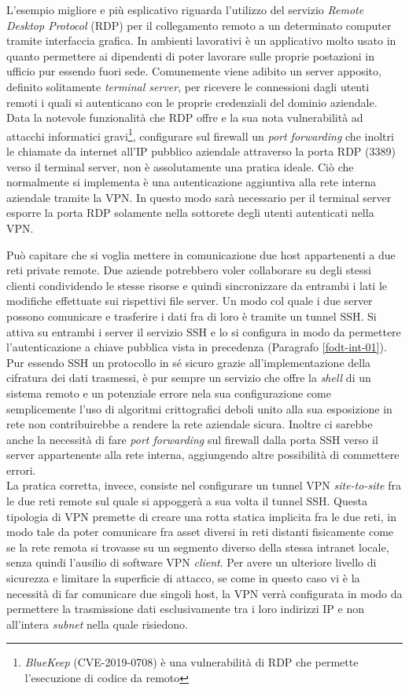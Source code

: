 \documentclass[target=bach,aauheader=]{thud}
\begin{document}
L'esempio migliore e più esplicativo riguarda l'utilizzo del servizio \textit{Remote Desktop Protocol} (RDP) per il collegamento remoto a un determinato computer tramite interfaccia grafica. In ambienti lavorativi è un applicativo molto usato in quanto permettere ai dipendenti di poter lavorare sulle proprie postazioni in ufficio pur essendo fuori sede. Comunemente viene adibito un server apposito, definito solitamente \textit{terminal server}, per ricevere le connessioni dagli utenti remoti i quali si autenticano con le proprie credenziali del dominio aziendale. Data la notevole funzionalità che RDP offre e la sua nota vulnerabilità ad attacchi informatici gravi\footnote{\textit{BlueKeep} (CVE-2019-0708) è una vulnerabilità di RDP che permette l'esecuzione di codice da remoto}, configurare sul firewall un \textit{port forwarding} che inoltri le chiamate da internet all'IP pubblico aziendale attraverso la porta RDP (3389) verso il terminal server, non è assolutamente una pratica ideale. Ciò che normalmente si implementa è una autenticazione aggiuntiva alla rete interna aziendale tramite la VPN. In questo modo sarà necessario per il terminal server esporre la porta RDP solamente nella sottorete degli utenti autenticati nella VPN.

Può capitare che si voglia mettere in comunicazione due host appartenenti a due reti private remote. Due aziende potrebbero voler collaborare su degli stessi clienti condividendo le stesse risorse e quindi sincronizzare da entrambi i lati le modifiche effettuate sui rispettivi file server. Un modo col quale i due server possono comunicare e trasferire i dati fra di loro è tramite un tunnel SSH. Si attiva su entrambi i server il servizio SSH e lo si configura in modo da permettere l'autenticazione a chiave pubblica vista in precedenza (Paragrafo \ref{fodt-int-01}). Pur essendo SSH un protocollo in sé sicuro grazie all'implementazione della cifratura dei dati trasmessi, è pur sempre un servizio che offre la \textit{shell} di un sistema remoto e un potenziale errore nela sua configurazione come semplicemente l'uso di algoritmi crittografici deboli unito alla sua esposizione in rete non contribuirebbe a rendere la rete aziendale sicura. Inoltre ci sarebbe anche la necessità di fare \textit{port forwarding} sul firewall dalla porta SSH verso il server appartenente alla rete interna, aggiungendo altre possibilità di commettere errori.
\\ La pratica corretta, invece, consiste nel configurare un tunnel VPN \textit{site-to-site} fra le due reti remote sul quale si appoggerà a sua volta il tunnel SSH. Questa tipologia di VPN premette di creare una rotta statica implicita fra le due reti, in modo tale da poter comunicare fra asset diversi in reti distanti fisicamente come se la rete remota si trovasse su un segmento diverso della stessa intranet locale, senza quindi l'ausilio di software VPN \textit{client}. Per avere un ulteriore livello di sicurezza e limitare la superficie di attacco, se come in questo caso vi è la necessità di far comunicare due singoli host, la VPN verrà configurata in modo da permettere la trasmissione dati esclusivamente tra i loro indirizzi IP e non all'intera \textit{subnet} nella quale risiedono.
\end{document}

